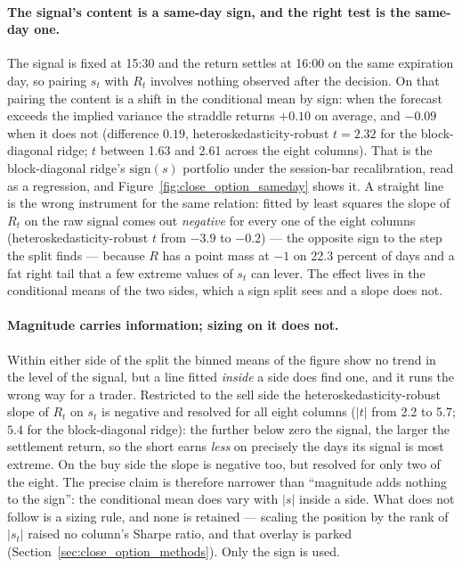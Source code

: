 \paragraph{The signal's content is a same-day sign, and the right test
is the same-day one.} The signal is fixed at 15:30 and the return
settles at 16:00 on the same expiration day, so pairing $s_t$ with
$R_t$ involves nothing observed after the decision. On that pairing
the content is a shift in the conditional mean by sign: when the
forecast exceeds the implied variance the straddle returns $+0.10$ on
average, and $-0.09$ when it does not (difference $0.19$,
heteroskedasticity-robust $t=2.32$ for the block-diagonal ridge; $t$
between 1.63 and 2.61 across
the eight columns). That is the block-diagonal ridge's $\mathrm{sign}(s)$ portfolio under the
session-bar recalibration, read as a regression, and
Figure~\ref{fig:close_option_sameday} shows it. A straight
line is the wrong instrument for the same relation: fitted by least squares
the slope of $R_t$ on the raw signal comes out \emph{negative} for every one
of the eight columns (heteroskedasticity-robust $t$ from $-3.9$ to
$-0.2$) --- the opposite sign to the step the split finds --- because
$R$ has a point mass at $-1$ on 22.3 percent of days and a fat right
tail that a few extreme values of $s_t$ can lever. The effect lives in the
conditional means of the two sides, which a sign split sees and a slope does
not.

\paragraph{Magnitude carries information; sizing on it does not.} Within
either side of the split the binned means of the figure show no trend in
the level of the signal, but a line fitted \emph{inside} a side does find
one, and it runs the wrong way for a trader. Restricted to the sell side
the heteroskedasticity-robust slope of $R_t$ on $s_t$ is negative and
resolved for all eight columns ($|t|$ from 2.2 to 5.7;
$5.4$ for the block-diagonal ridge): the further below zero the
signal, the larger the settlement return, so the short earns \emph{less}
on precisely the days its signal is most extreme. On the buy side the
slope is negative too, but resolved for only two of the eight. The
precise claim is therefore narrower than ``magnitude adds nothing to the
sign'': the conditional mean does vary with $|s|$ inside a side. What does
not follow is a sizing rule, and none is retained --- scaling the position
by the rank of $|s_t|$ raised no column's Sharpe ratio, and that overlay is
parked (Section~\ref{sec:close_option_methods}). Only the sign is used.

